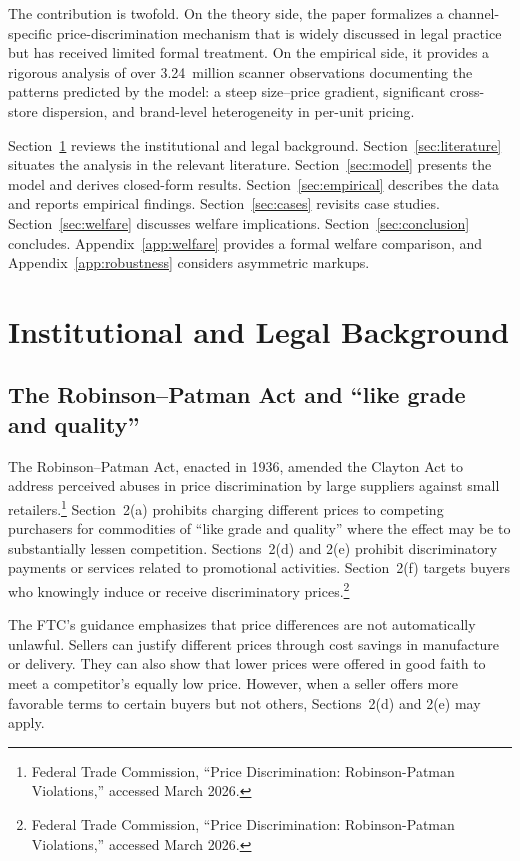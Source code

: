 \documentclass[12pt]{article}
\theoremstyle{definition}
\begin{document}
The contribution is twofold.
On the theory side, the paper formalizes a channel-specific price-discrimination mechanism that is widely discussed in legal practice but has received limited formal treatment.
On the empirical side, it provides a rigorous analysis of over 3.24~million scanner observations documenting the patterns predicted by the model: a steep size--price gradient, significant cross-store dispersion, and brand-level heterogeneity in per-unit pricing.

Section~\ref{sec:background} reviews the institutional and legal background.
Section~\ref{sec:literature} situates the analysis in the relevant literature.
Section~\ref{sec:model} presents the model and derives closed-form results.
Section~\ref{sec:empirical} describes the data and reports empirical findings.
Section~\ref{sec:cases} revisits case studies.
Section~\ref{sec:welfare} discusses welfare implications.
Section~\ref{sec:conclusion} concludes.
Appendix~\ref{app:welfare} provides a formal welfare comparison, and Appendix~\ref{app:robustness} considers asymmetric markups.


\section{Institutional and Legal Background}\label{sec:background}

\subsection{The Robinson--Patman Act and ``like grade and quality''}

The Robinson--Patman Act, enacted in 1936, amended the Clayton Act to address perceived abuses in price discrimination by large suppliers against small retailers.\footnote{Federal Trade Commission, ``Price Discrimination: Robinson-Patman Violations,'' accessed March 2026.}
Section~2(a) prohibits charging different prices to competing purchasers for commodities of ``like grade and quality'' where the effect may be to substantially lessen competition.
Sections~2(d) and 2(e) prohibit discriminatory payments or services related to promotional activities. Section~2(f) targets buyers who knowingly induce or receive discriminatory prices.\footnote{Federal Trade Commission, ``Price Discrimination: Robinson-Patman Violations,'' accessed March 2026.}

The FTC's guidance emphasizes that price differences are not automatically unlawful.
Sellers can justify different prices through cost savings in manufacture or delivery. They can also show that lower prices were offered in good faith to meet a competitor's equally low price.
However, when a seller offers more favorable terms to certain buyers but not others, Sections~2(d) and 2(e) may apply.
\end{document}
